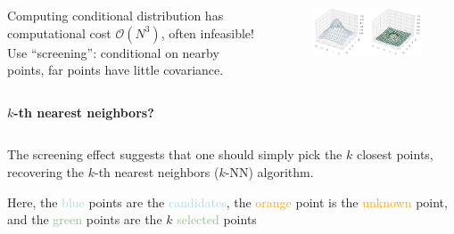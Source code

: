 \documentclass{beamer}                             %
\newcommand{\blocktitle}[1]{{\Large \textbf{#1}}}
\begin{document}
\begin{frame}[t]
\begin{columns}[T]
\begin{column}{0.30\textwidth}
\begin{tcolorbox}
    \begin{columns}
      \begin{column}{0.5\textwidth}
        Computing conditional distribution has computational cost \(
        \mathcal{O}(N^3) \), often infeasible! Use ``screening'':
        conditional on nearby points, far points have little covariance.
      \end{column}
      \begin{column}{0.5\textwidth}
        \begin{figure}[h!]
          \centering
          \includegraphics[width=\textwidth]{kernel2d.png}
        \end{figure}
      \end{column}
    \end{columns}
  \end{tcolorbox}

  \begin{tcolorbox}
    \blocktitle{\( k \)-th nearest neighbors?}

    \begin{columns}
      \begin{column}{0.5\textwidth}
        The screening effect suggests that one should simply
        pick the \( k \) closest points, recovering the \(
        k \)-th nearest neighbors (\( k \)-NN) algorithm.

        \vspace{\baselineskip}
        Here, the \textcolor{lightblue}{blue} points are the
        \textcolor{lightblue}{candidates}, the \textcolor{orange}{orange}
        point is the \textcolor{orange}{unknown} point, and the
        \textcolor{darkseagreen}{green} points are the \( k \)
        \textcolor{darkseagreen}{selected} points


\end{column}
\end{columns}
\end{tcolorbox}
\end{column}
\end{columns}
\end{frame}
\end{document}
